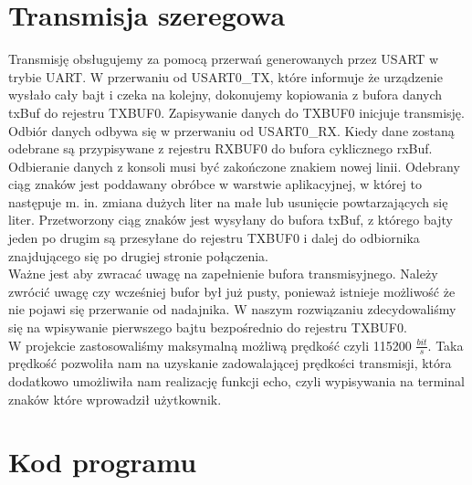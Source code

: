 \documentclass[a4paper,titlepage,11pt,floatssmall]{mwrep}
\begin{document}
\section{Transmisja szeregowa}
Transmisję obsługujemy za pomocą przerwań generowanych przez USART w trybie UART. W przerwaniu od USART0\_{}TX, które informuje że urządzenie wysłało cały bajt i czeka na kolejny, dokonujemy kopiowania z bufora danych txBuf do rejestru TXBUF0. Zapisywanie danych do TXBUF0 inicjuje transmisję. Odbiór danych odbywa się w przerwaniu od USART0\_{}RX. Kiedy dane zostaną odebrane są przypisywane z rejestru RXBUF0 do bufora cyklicznego rxBuf. Odbieranie danych z konsoli musi być zakończone znakiem nowej linii. Odebrany ciąg znaków jest poddawany obróbce w warstwie aplikacyjnej, w której to następuje m. in. zmiana dużych liter na małe lub usunięcie powtarzających się liter. Przetworzony ciąg znaków jest wysyłany do bufora txBuf, z którego bajty jeden po drugim są przesyłane do rejestru TXBUF0 i dalej do odbiornika znajdującego się po drugiej stronie połączenia. \\
\indent{} Ważne jest aby zwracać uwagę na zapełnienie bufora transmisyjnego. Należy zwrócić uwagę czy wcześniej bufor był już pusty, ponieważ istnieje możliwość że nie pojawi się przerwanie od nadajnika. W naszym rozwiązaniu zdecydowaliśmy się na wpisywanie pierwszego bajtu bezpośrednio do rejestru TXBUF0. \\
\indent{} W projekcie zastosowaliśmy maksymalną możliwą prędkość czyli 115200 $\frac{bit}{s}$. Taka prędkość pozwoliła nam na uzyskanie zadowalającej prędkości transmisji, która dodatkowo umożliwiła nam realizację funkcji echo, czyli wypisywania na terminal znaków które wprowadził użytkownik.

\section{Kod programu}
\end{document}

